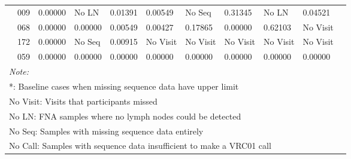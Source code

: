 \documentclass[
]{article}
\begin{document}
\begin{table}[!h]
\begin{tabular}[t]{l>{}l|lllllll>{}l|>{\raggedleft\arraybackslash}p{1.2cm}|}
\hspace{1em} & 009 & 0.00000 & No LN & 0.01391 & 0.00549 & No Seq & 0.31345 & No LN & 0.04521 & 4\\

\hspace{1em} & 068 & 0.00000 & 0.00000 & 0.00549 & 0.00427 & 0.17865 & 0.00000 & 0.62103 & No Visit & 4\\

\hspace{1em} & 172 & 0.00000 & No Seq & 0.00915 & No Visit & No Visit & No Visit & No Visit & No Visit & 1\\

\hspace{1em} & 059 & 0.00000 & 0.00000 & 0.00000 & 0.00000 & 0.00000 & 0.00000 & 0.00000 & 0.00000 & 0\\
\bottomrule
\multicolumn{11}{l}{\rule{0pt}{1em}\textit{Note: }}\\
\multicolumn{11}{l}{\rule{0pt}{1em}*: Baseline cases when missing sequence data have upper limit}\\
\multicolumn{11}{l}{\rule{0pt}{1em}No Visit: Visits that participants missed}\\
\multicolumn{11}{l}{\rule{0pt}{1em}No LN: FNA samples where no lymph nodes could be detected}\\
\multicolumn{11}{l}{\rule{0pt}{1em}No Seq: Samples with missing sequence data entirely}\\
\multicolumn{11}{l}{\rule{0pt}{1em}No Call: Samples with sequence data insufficient to make a VRC01 call}\\
\end{tabular}
\end{table}
\end{document}
